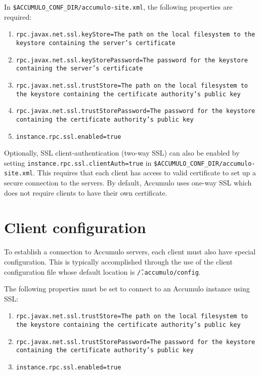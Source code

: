In \texttt{\$ACCUMULO\_CONF\_DIR/accumulo-site.xml}, the following properties are required:

\begin{enumerate}
\item{\texttt{rpc.javax.net.ssl.keyStore=The path on the local filesystem to the keystore containing the server's certificate}}
\item{\texttt{rpc.javax.net.ssl.keyStorePassword=The password for the keystore containing the server's certificate}}
\item{\texttt{rpc.javax.net.ssl.trustStore=The path on the local filesystem to the keystore containing the certificate authority's public key}}
\item{\texttt{rpc.javax.net.ssl.trustStorePassword=The password for the keystore containing the certificate authority's public key}}
\item{\texttt{instance.rpc.ssl.enabled=true}}
\end{enumerate}

Optionally, SSL client-authentication (two-way SSL) can also be enabled by setting
\texttt{instance.rpc.ssl.clientAuth=true} in \texttt{\$ACCUMULO\_CONF\_DIR/accumulo-site.xml}.
This requires that each client has access to  valid certificate to set up a secure connection
to the servers. By default, Accumulo uses one-way SSL which does not require clients to have
their own certificate.

\section{Client configuration}

To establish a connection to Accumulo servers, each client must also have
special configuration. This is typically accomplished through the use of
the client configuration file whose default location is \texttt{\~/.accumulo/config}.

The following properties must be set to connect to an Accumulo instance using SSL:

\begin{enumerate}
\item{\texttt{rpc.javax.net.ssl.trustStore=The path on the local filesystem to the keystore containing the certificate authority's public key}}
\item{\texttt{rpc.javax.net.ssl.trustStorePassword=The password for the keystore containing the certificate authority's public key}}
\item{\texttt{instance.rpc.ssl.enabled=true}}
\end{enumerate}

